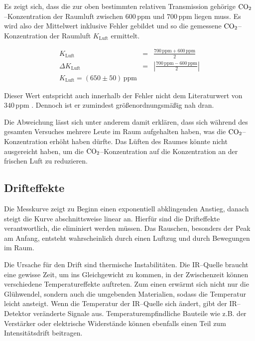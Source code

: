 \documentclass[12pt,a4paper]{scrartcl}
\numberwithin{equation}{section} %
\begin{document}
Es zeigt sich, dass  die zur oben bestimmten relativen Transmission gehörige $\ce{CO_2}$--Konzentration der Raumluft zwischen $600 \mathrm{\, ppm}$ und $700 \mathrm{\, ppm}$ liegen muss. Es wird also der Mittelwert inklusive Fehler gebildet und so die gemessene $\ce{CO_2}$--Konzentration der Raumluft $K_\mathrm{Luft}$ ermittelt.

\begin{eqnarray}
	K_\mathrm{Luft} &=& \frac{700 \mathrm{\, ppm} + 600 \mathrm{\, ppm}}{2} \\
	\Delta K_\mathrm{Luft} &=& \left|\frac{700 \mathrm{\, ppm} - 600 \mathrm{\, ppm}}{2}\right| \\
	K_\mathrm{Luft} = (650 \pm 50) \mathrm{\, ppm}
\end{eqnarray}

Dieser Wert entspricht auch innerhalb der Fehler nicht dem Literaturwert von $340 \mathrm{\, ppm}$ \cite{Demtröder Kern/Atom}. Dennoch ist er zumindest größenordnungsmäßig nah dran.

Die Abweichung lässt sich unter anderem damit erklären, dass sich während des gesamten Versuches mehrere Leute im Raum aufgehalten haben, was die $\ce{CO_2}$--Konzentration erhöht haben dürfte. Das Lüften des Raumes könnte nicht ausgereicht haben, um die $\ce{CO_2}$--Konzentration auf die Konzentration an der frischen Luft zu reduzieren.

\subsection{Drifteffekte}
\label{Drifteffekte}

Die Messkurve zeigt zu Beginn einen exponentiell abklingenden Anstieg, danach steigt die Kurve abschnittsweise linear an. Hierfür sind die Drifteffekte verantwortlich, die eliminiert werden müssen. Das Rauschen, besonders der Peak am Anfang, entsteht wahrscheinlich durch einen Luftzug und durch Bewegungen im Raum.

Die Ursache für den Drift sind thermische Instabilitäten. Die IR--Quelle braucht eine gewisse Zeit, um ins Gleichgewicht zu kommen, in der Zwischenzeit können verschiedene Temperatureffekte auftreten. Zum einen erwärmt sich nicht nur die Glühwendel, sondern auch die umgebenden Materialien, sodass die Temperatur leicht ansteigt. Wenn die Temperatur der IR--Quelle sich ändert, gibt der IR--Detektor veränderte Signale aus. Temperaturempfindliche Bauteile wie z.B. der Verstärker oder elektrische Widerstände können ebenfalls einen Teil zum Intensitätsdrift beitragen.
\end{document}
